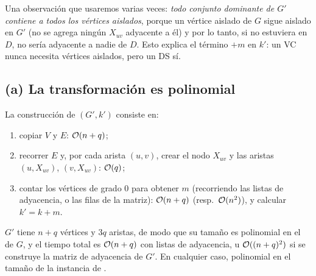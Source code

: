 \begin{center}
\end{center}

Una observación que usaremos varias veces: \emph{todo conjunto dominante de $G'$ contiene a todos los vértices
aislados}, porque un vértice aislado de $G$ sigue aislado en $G'$ (no se agrega ningún $X_{uv}$ adyacente a él)
y por lo tanto, si no estuviera en $D$, no sería adyacente a nadie de $D$. Esto explica el término $+m$ en $k'$:
un VC nunca necesita vértices aislados, pero un DS sí.

\subsection*{(a) La transformación es polinomial}

La construcción de $(G',k')$ consiste en:
\begin{enumerate}
  \item copiar $V$ y $E$: $\mathcal{O}(n+q)$;
  \item recorrer $E$ y, por cada arista $(u,v)$, crear el nodo $X_{uv}$ y las aristas $(u,X_{uv})$, $(v,X_{uv})$:
  $\mathcal{O}(q)$;
  \item contar los vértices de grado 0 para obtener $m$ (recorriendo las listas de adyacencia, o las filas de la
  matriz): $\mathcal{O}(n+q)$ (resp.\ $\mathcal{O}(n^2)$), y calcular $k'=k+m$.
\end{enumerate}
$G'$ tiene $n+q$ vértices y $3q$ aristas, de modo que su tamaño es polinomial en el de $G$, y el tiempo total
es $\mathcal{O}(n+q)$ con listas de adyacencia, u $\mathcal{O}((n+q)^2)$ si se construye la matriz de adyacencia de $G'$. En
cualquier caso, polinomial en el tamaño de la instancia de \VC.

